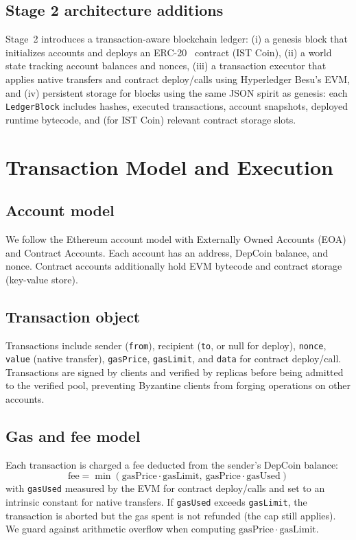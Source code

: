 \documentclass[runningheads]{llncs}
\begin{document}
\subsection{Stage 2 architecture additions}
Stage~2 introduces a transaction-aware blockchain ledger:
(i) a genesis block that initializes accounts and deploys an ERC-20~\cite{erc20} contract (IST Coin),
(ii) a world state tracking account balances and nonces,
(iii) a transaction executor that applies native transfers and contract deploy/calls using Hyperledger Besu's EVM,
and (iv) persistent storage for blocks using the same JSON spirit as genesis: each \texttt{LedgerBlock} includes hashes, executed
transactions, account snapshots, deployed runtime bytecode, and (for IST Coin) relevant contract storage slots.

\section{Transaction Model and Execution}
\subsection{Account model}
We follow the Ethereum account model with Externally Owned Accounts (EOA) and Contract Accounts.
Each account has an address, DepCoin balance, and nonce. Contract accounts additionally hold EVM bytecode and contract storage (key-value store).

\subsection{Transaction object}
Transactions include sender (\texttt{from}), recipient (\texttt{to}, or null for deploy), \texttt{nonce}, \texttt{value} (native transfer),
\texttt{gasPrice}, \texttt{gasLimit}, and \texttt{data} for contract deploy/call.
Transactions are signed by clients and verified by replicas before being admitted to the verified pool, preventing Byzantine clients from forging
operations on other accounts.

\subsection{Gas and fee model}
Each transaction is charged a fee deducted from the sender's DepCoin balance:
\[
\mathrm{fee} = \min(\mathrm{gasPrice}\cdot \mathrm{gasLimit},\ \mathrm{gasPrice}\cdot \mathrm{gasUsed})
\]
with \texttt{gasUsed} measured by the EVM for contract deploy/calls and set to an intrinsic constant for native transfers.
If \texttt{gasUsed} exceeds \texttt{gasLimit}, the transaction is aborted but the gas spent is not refunded (the cap still applies).
We guard against arithmetic overflow when computing $\mathrm{gasPrice}\cdot\mathrm{gasLimit}$.
\end{document}
